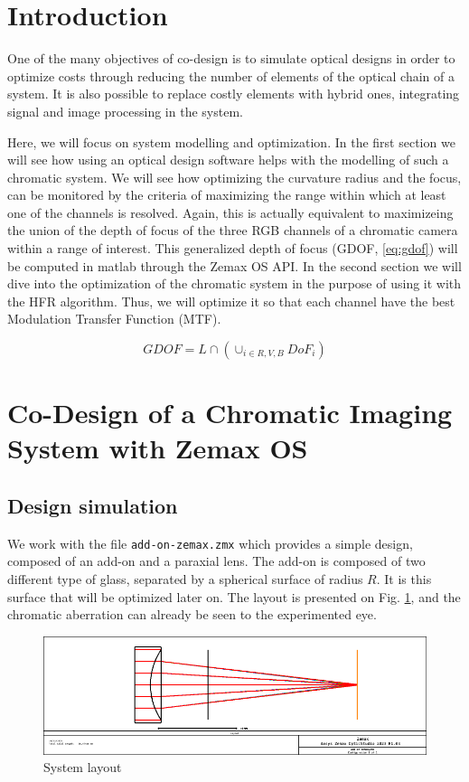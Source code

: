 \documentclass[10pt,letterpaper]{article}
\begin{document}
\section{Introduction}
One of the many objectives of co-design is to simulate optical designs in order to optimize costs through reducing the number of elements of the optical chain of a system. It is also possible to replace costly elements with hybrid ones, integrating signal and image processing in the system.

Here, we will focus on system modelling and optimization. In the first section we will see how using an optical design software helps with the modelling of such a chromatic system. We will see how optimizing the curvature radius and the focus, can be monitored by the criteria of maximizing the range within which at least one of the channels is resolved. Again, this is actually equivalent to maximizeing the union of the depth of focus of the three RGB channels of a chromatic camera within a range of interest. This generalized depth of focus (GDOF, \ref{eq:gdof}) will be computed in matlab through the Zemax OS API.  In the second section we will dive into the optimization of the chromatic system in the purpose of using it with the HFR algorithm. Thus, we will optimize it so that each channel have the best Modulation Transfer Function (MTF).

\begin{equation}\label{eq:gdof}
    G D O F=L \cap\left(\cup_{i \in R, V, B} D o F_i\right)
\end{equation}


\section{Co-Design of a Chromatic Imaging System with Zemax OS}
\subsection{Design simulation}

We work with the file \texttt{add-on-zemax.zmx} which provides a simple design, composed of an add-on and a paraxial lens. The add-on is composed of two different type of glass, separated by a spherical surface of radius $R$. It is this surface that will be optimized later on. The layout is presented on Fig. \ref{fig:layout}, and the chromatic aberration can already be seen to the experimented eye.

\begin{figure}[h]
	\centering
	\includegraphics[scale=0.45]{Layout.png}
	\caption{System layout}
	\label{fig:layout}
\end{figure}
\end{document}
